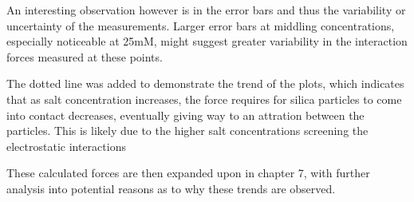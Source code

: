 An interesting observation however is in the error bars and thus the variability or uncertainty of the measurements. Larger error bars at middling concentrations, especially noticeable at 25mM, might suggest greater variability in the interaction forces measured at these points.

The dotted line was added to demonstrate the trend of the plots, which indicates that as salt concentration increases, the force requires for silica particles to come into contact decreases, eventually giving way to an attration between the particles. This is likely due to the higher salt concentrations screening the electrostatic interactions

These calculated forces are then expanded upon in chapter 7, with further analysis into potential reasons as to why these trends are observed.